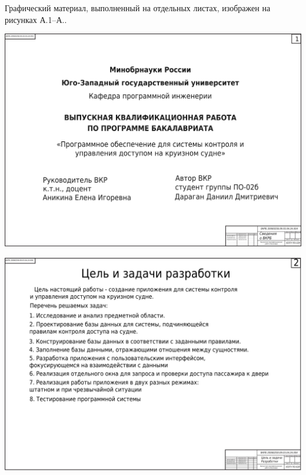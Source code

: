 
Графический материал, выполненный на отдельных листах,
изображен на рисунках А.1--А..
\setcounter{числоПлакатов}{9}

\renewcommand{\thefigure}{А.\arabic{figure}} %

\begin{landscape}
	
\begin{плакат}
	\includegraphics[width=0.82\linewidth]{images/плакат1.png}
	\label{fig:1}
\end{плакат}

\begin{плакат}
	\includegraphics[width=0.82\linewidth]{images/плакат2.png}
	\label{fig:2}
\end{плакат}


\end{landscape}
